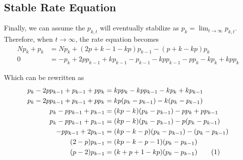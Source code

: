 \subsection{Stable Rate Equation}

    Finally, we can assume the $p_{k,t}$ will eventually stabilize as $p_k = \lim_{t \to \infty} p_{k,t}$. Therefore, when $t \to \infty$, the rate equation becomes
    \begin{align*}
        N p_k + p_k &= N p_k + (2p + k - 1 - k p) p_{k-1} - (p + k - k p) p_k \\
        0 &= -p_k + 2p p_{k-1} + k p_{k-1} - p_{k-1} - k p p_{k-1} - p p_k - k p_k + k p p_k
    \end{align*}

    Which can be rewritten as
    \begin{align*}
        p_k - 2p p_{k-1} + p_{k-1} + p p_k &= k p p_k - k p p_{k-1} - k p_{k} + k p_{k-1} \\
        p_k - 2 p p_{k-1} + p_{k-1} + p p_k &= k p (p_k - p_{k-1}) - k (p_k - p_{k-1}) \\
        p_k - p p_{k-1} + p_{k-1} &= (k p - k) (p_k - p_{k-1}) - p p_k + p p_{k-1} \\
        p_k - p p_{k-1} + p_{k-1} &= (k p - k) (p_k - p_{k-1}) - p (p_k - p_{k-1}) \\
        - p p_{k-1} + 2 p_{k-1} &= (k p - k - p) (p_k - p_{k-1}) - (p_k - p_{k-1}) \\
        (2 - p) p_{k-1} &= (k p - k - p - 1) (p_k - p_{k-1}) \\
        (p - 2) p_{k-1} &= (k + p + 1 - k p) (p_k - p_{k-1})
        \addtocounter{equation}{1}\tag{\theequation} \label{eq:stable}
    \end{align*}
